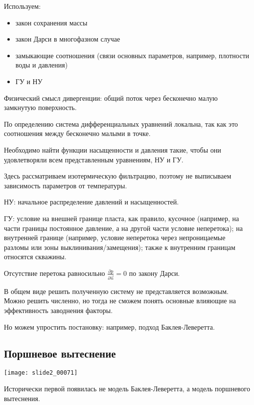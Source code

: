 \documentclass[main.tex]{subfiles}
\begin{document}

Используем:
\begin{itemize}
	\item закон сохранения массы
	\item закон Дарси в многофазном случае
	\item замыкающие соотношения (связи основных параметров, например, плотности воды и давления)
	\item ГУ и НУ
\end{itemize}

Физический смысл дивергенции: общий поток через бесконечно малую замкнутую поверхность.

По определению система дифференциальных уравнений локальна, так как это соотношения между бесконечно малыми в точке.

Необходимо найти функции насыщенности и давления такие, чтобы они удовлетворяли всем представленным уравнениям, НУ и ГУ.


Здесь рассматриваем изотермическую фильтрацию, поэтому не выписываем зависимость параметров от температуры.

НУ: начальное распределение давлений и насыщенностей.

ГУ: условие на внешней границе пласта, как правило, кусочное (например, на части границы постоянное давление, а на другой части условие неперетока); на внутренней границе (например, условие неперетока через непроницаемые разломы или зоны выклинивания/замещения); также к внутренним границам относятся скважины.

Отсутствие перетока равносильно $\displaystyle{}\frac{\partial p}{\partial \vec{n}}=0$ по закону Дарси.

В общем виде решить полученную систему не представляется возможным. Можно решить численно, но тогда не сможем понять основные влияющие на эффективность заводнения факторы.

Но можем упростить постановку: например, подход Баклея-Леверетта.

\subsection{Поршневое вытеснение}

\texttt{[image: slide2\_00071]}

Исторически первой появилась не модель Баклея-Леверетта, а модель поршневого вытеснения.
\end{document}
